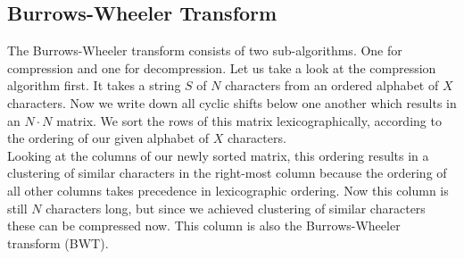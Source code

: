 \documentclass[conference]{IEEEtran}
\begin{document}
\subsection{Burrows-Wheeler Transform}
The Burrows-Wheeler transform consists of two sub-algorithms. One for compression and one for decompression. Let us take a look at the compression algorithm first. It takes a string $S$ of $N$ characters from an ordered alphabet of $X$ characters. Now we write down all cyclic shifts below one another which results in an $N \cdot N$ matrix. We sort the rows of this matrix lexicographically, according to the ordering of our given alphabet of $X$ characters. \\
Looking at the columns of our newly sorted matrix, this ordering results in a clustering of similar characters in the right-most column because the ordering of all other columns takes precedence in lexicographic ordering. Now this column is still $N$ characters long, but since we achieved clustering of similar characters these can be compressed now. This column is also the Burrows-Wheeler transform (BWT)\cite{burrows1994blocksorting}.


\vspace{0.5cm}
\end{document}
